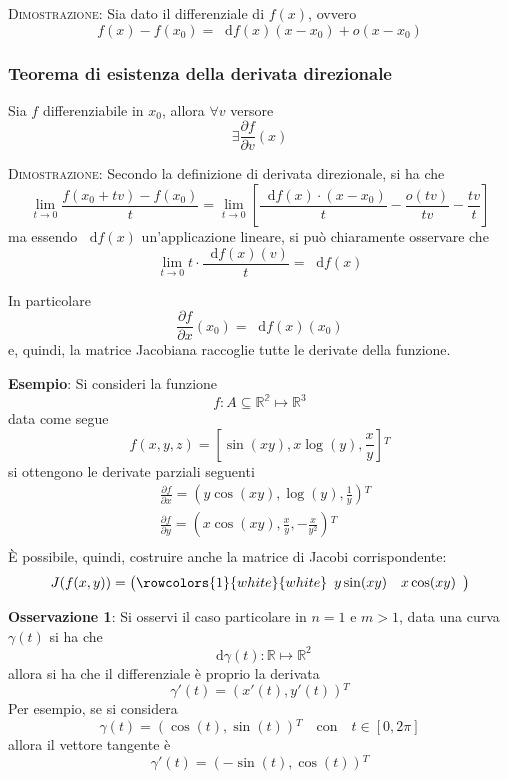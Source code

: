 \documentclass[a4paper]{extarticle}
\newcommand*\dif{\mathop{}\!\mathrm{d}}
\begin{document}
\vspace{2em}
\noindent
\normalfont \normalsize
\textsc{Dimostrazione}: Sia dato il differenziale di $f(x)$, ovvero
\[f(x)-f(x_0) = \dif f(x)(x-x_0)+o(x-x_0)\]

\vspace{2em}
\noindent
\subsubsection{Teorema di esistenza della derivata direzionale}
Sia $f$ differenziabile in $x_0$, allora $\forall v$ versore
\[\exists \frac{\partial f}{\partial v}(x)\]

\vspace{2em}
\noindent
\normalfont \normalsize
\textsc{Dimostrazione}: Secondo la definizione di derivata direzionale, si ha che
\[\lim_{t \to 0} \frac{f(x_0+tv) - f(x_0)}{t} = \lim_{t \to 0} \left[ \frac{\dif f(x) \cdot (x-x_0)}{t} - \frac{o(t v)}{tv} - \frac{tv}{t}\right]\]
ma essendo $\dif f(x)$ un'applicazione lineare, si può chiaramente osservare che
\[\lim_{t \to 0} t \cdot \frac{\dif f(x)(v)}{t} = \dif f(x)\]

\vspace{1em}
\noindent
In particolare
\[\frac{\partial f}{\partial x}(x_0) = \dif f(x) (x_0)\]
e, quindi, la matrice Jacobiana raccoglie tutte le derivate della funzione.

\vspace{1em}
\noindent
\textbf{Esempio}: Si consideri la funzione
\[f : A \subseteq \mathbb{R^2} \longmapsto \mathbb{R}^3\]
data come segue
\[f(x,y,z)=\left[\sin(xy),x \log(y),\frac{x}{y}\right]{^T}\]
si ottengono le derivate parziali seguenti
\begin{align*}
    &\frac{\partial f}{\partial x} = \left(y\cos(xy),\log(y),\frac{1}{y}\right){^T}\\
    &\frac{\partial f}{\partial y} = \left(x\cos(xy),\frac{x}{y},-\frac{x}{y^2}\right){^T}\\
\end{align*}
È possibile, quindi, costruire anche la matrice di Jacobi corrispondente:
\[J(f(x,y)) = \left(
    \rowcolors{1}{white}{white}
    \begin{array}{cc}
        y \sin(xy) & x \cos(xy)\\
    \end{array}
\right)\]


\vspace{2em}
\noindent
\textbf{Osservazione 1}: Si osservi il caso particolare in $n=1$ e $m>1$, data una curva $\gamma(t)$ si ha che
\[\dif \gamma(t) : \mathbb{R} \longmapsto \mathbb{R}^2\]
allora si ha che il differenziale è proprio la derivata
\[\gamma'(t) = \left(x'(t),y'(t)\right){^T}\]
Per esempio, se si considera
\[\gamma(t)=(\cos(t),\sin(t)){^T} \hspace{1em} \text{con} \hspace{1em} t \in [0,2\pi]\]
allora il vettore tangente è
\[\gamma'(t)=\left(-\sin(t),\cos(t)\right){^T}\]
\end{document}
